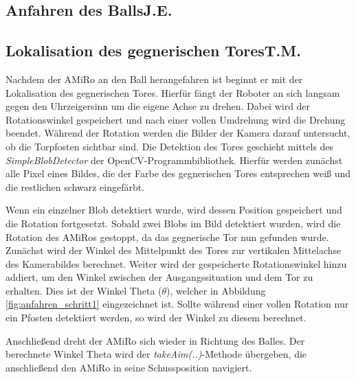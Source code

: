\subsection[Anfahren des Balls]{Anfahren des Balls\hfill {\normalsize J.E.}} %

\subsection[Lokalisation des gegnerischen Tores]{Lokalisation des gegnerischen Tores\hfill {\normalsize T.M.}} %

Nachdem der AMiRo an den Ball herangefahren ist beginnt er mit der Lokalisation des gegnerischen Tores. 
Hierfür fängt der Roboter an sich langsam gegen den Uhrzeigersinn um die eigene Achse zu drehen. Dabei wird der Rotationswinkel gespeichert und nach einer vollen Umdrehung wird die Drehung beendet. 
Während der Rotation werden die Bilder der Kamera darauf untersucht, ob die Torpfosten sichtbar sind. Die Detektion des Tores geschieht mittels des \textit{SimpleBlobDetector} der OpenCV-Programmbibliothek. Hierfür werden zunächst alle Pixel eines Bildes, die der Farbe des gegnerischen Tores entsprechen weiß und die restlichen schwarz eingefärbt.

Wenn ein einzelner Blob detektiert wurde, wird dessen Position gespeichert und die Rotation fortgesetzt. Sobald zwei Blobs im Bild detektiert wurden, wird die Rotation des AMiRos gestoppt, da das gegnerische Tor nun gefunden wurde. Zunächst wird der Winkel des Mittelpunkt des Tores zur vertikalen Mittelachse des Kamerabildes berechnet. Weiter wird der gespeicherte Rotationswinkel hinzu addiert, um den Winkel zwischen der Ausgangssituation und dem Tor zu erhalten. Dies ist der Winkel Theta ($\theta$), welcher in Abbildung \ref{fig:anfahren_schritt1} eingezeichnet ist. 
Sollte während einer vollen Rotation nur ein Pfosten detektiert werden, so wird der Winkel zu diesem berechnet.

Anschließend dreht der AMiRo sich wieder in Richtung des Balles. Der berechnete Winkel Theta wird der \textit{takeAim(..)}-Methode übergeben, die anschließend den AMiRo in seine Schussposition navigiert.


